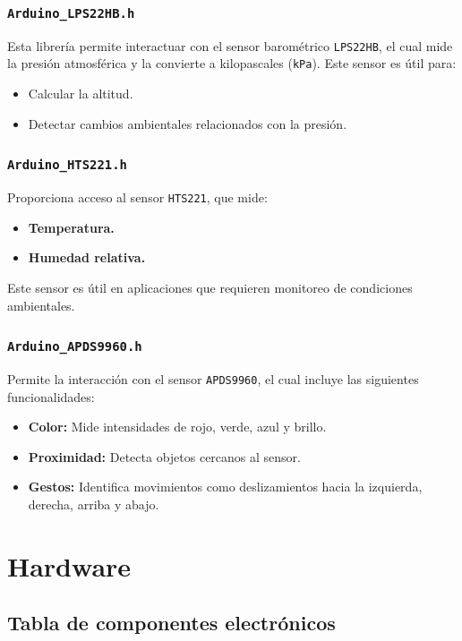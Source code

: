 \documentclass[12pt,a4paper]{article}
\begin{document}
\subsubsection{\texttt{Arduino\_LPS22HB.h}}
Esta librería permite interactuar con el sensor barométrico \texttt{LPS22HB}, el cual mide la presión atmosférica y la convierte a kilopascales (\texttt{kPa}). Este sensor es útil para:
\begin{itemize}
    \item Calcular la altitud.
    \item Detectar cambios ambientales relacionados con la presión.
\end{itemize}

\subsubsection{\texttt{Arduino\_HTS221.h}}
Proporciona acceso al sensor \texttt{HTS221}, que mide:
\begin{itemize}
    \item \textbf{Temperatura.}
    \item \textbf{Humedad relativa.}
\end{itemize}
Este sensor es útil en aplicaciones que requieren monitoreo de condiciones ambientales.

\subsubsection{\texttt{Arduino\_APDS9960.h}}
Permite la interacción con el sensor \texttt{APDS9960}, el cual incluye las siguientes funcionalidades:
\begin{itemize}
    \item \textbf{Color:} Mide intensidades de rojo, verde, azul y brillo.
    \item \textbf{Proximidad:} Detecta objetos cercanos al sensor.
    \item \textbf{Gestos:} Identifica movimientos como deslizamientos hacia la izquierda, derecha, arriba y abajo.
\end{itemize}

\section{Hardware}%
\subsection{Tabla de componentes electrónicos}
\end{document}

